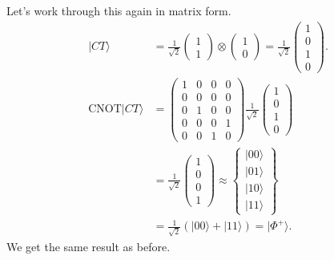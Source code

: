 \documentclass[lasers.tex]{subfiles}
\begin{document}
\begin{example}
    Let's work through this again in matrix form.
    \begin{align}
        |CT\rangle &= \frac{1}{\sqrt{2}}\begin{pmatrix} 1 \\ 1\end{pmatrix}\otimes\begin{pmatrix}1\\0\end{pmatrix} = \frac{1}{\sqrt{2}}\begin{pmatrix} 1\\0\\1\\0\end{pmatrix}. \\
        \text{CNOT}|CT\rangle &= \begin{pmatrix} 1 & 0 & 0 & 0 \\ 0 & 0 & 0 & 0 \\ 0 & 1 & 0 & 0 \\ 0 & 0 & 0 & 1 \\ 0 & 0 & 1 & 0 \end{pmatrix}\frac{1}{\sqrt{2}}\begin{pmatrix}1\\0\\1\\0\end{pmatrix}\\
                              &= \frac{1}{\sqrt{2}}\begin{pmatrix}1\\0\\0\\1\end{pmatrix} \approx \begin{Bmatrix} |00\rangle \\ |01\rangle \\ |10\rangle \\ |11\rangle\end{Bmatrix} \\
                              &= \frac{1}{\sqrt{2}}\left(|00\rangle+|11\rangle\right) = |\Phi^+\rangle.
    \end{align}
    We get the same result as before. 
\end{example}
\end{document}
